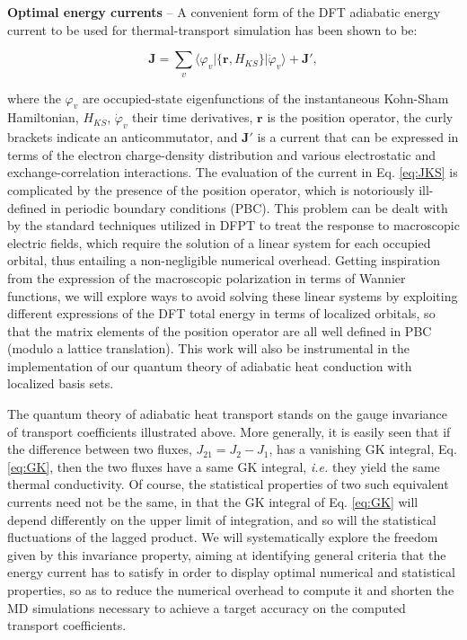 \smallskip\noindent\textbf{Optimal energy currents} -- A convenient form of the DFT adiabatic energy current to be used for thermal-transport simulation has been shown to be:\cite{Marcolongo2016}
\begin{linenomath}\begin{equation}
\mathbf{J} = \sum_v\langle\varphi_v|\{\mathbf{r}, H_{KS} \}| \dot\varphi_v \rangle+\mathbf{J}',
\label{eq:JKS}\end{equation}\end{linenomath}
where the $\varphi_v$ are occupied-state eigenfunctions of the instantaneous Kohn-Sham Hamiltonian, $H_{KS}$, $\dot\varphi_v$ their time derivatives, $\mathbf{r}$ is the position operator, the curly brackets indicate an anticommutator, and $\mathbf{J}'$ is a current that can be expressed in terms of the electron charge-density distribution and various electrostatic and exchange-correlation interactions.\cite{Marcolongo2016} The evaluation of the current in Eq. \eqref{eq:JKS} is complicated by the presence of the position operator, which is notoriously ill-defined in periodic boundary conditions (PBC).\cite{Resta2007} This problem can be dealt with by the standard techniques utilized in DFPT to treat the response to macroscopic electric fields,\cite{Baroni2001,Marcolongo2016} which require the solution of a linear system for each occupied orbital, thus entailing a non-negligible numerical overhead. Getting inspiration from the expression of the macroscopic polarization in terms of Wannier functions,\cite{Marzari2012,Resta2007} we will explore ways to avoid solving these linear systems by exploiting different expressions of the DFT total energy in terms of localized orbitals, so that the matrix elements of the position operator are all well defined in PBC (modulo a lattice translation). This work will also be instrumental in the implementation of our quantum theory of adiabatic heat conduction with localized basis sets.

The quantum theory of adiabatic heat transport stands on the gauge invariance of transport coefficients illustrated above. More generally, it is easily seen that if the difference between two fluxes, $J_{21}=J_2-J_1$, has a vanishing GK integral, Eq. \eqref{eq:GK}, then the two fluxes have a same GK integral, \emph{i.e.} they yield the same thermal conductivity.\cite{Marcolongo2016} Of course, the statistical properties of two such equivalent currents need not be the same, in that the GK integral of Eq. \eqref{eq:GK} will depend differently on the upper limit of integration, and so will the statistical fluctuations of the lagged product. We will systematically explore the freedom given by this invariance property, aiming at identifying general criteria that the energy current has to satisfy in order to display optimal numerical and statistical properties, so as to reduce the numerical overhead to compute it and shorten the MD simulations necessary to achieve a target accuracy on the computed transport coefficients. 

